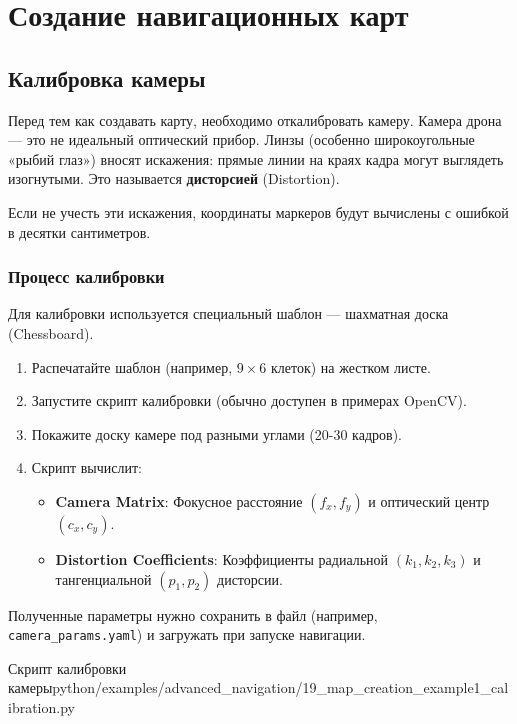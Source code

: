 \section{Создание навигационных карт}

\subsection{Калибровка камеры}
Перед тем как создавать карту, необходимо откалибровать камеру. Камера дрона — это не идеальный оптический прибор. Линзы (особенно широкоугольные «рыбий глаз») вносят искажения: прямые линии на краях кадра могут выглядеть изогнутыми. Это называется \textbf{дисторсией} (Distortion).

Если не учесть эти искажения, координаты маркеров будут вычислены с ошибкой в десятки сантиметров.

\subsubsection{Процесс калибровки}
Для калибровки используется специальный шаблон — шахматная доска (Chessboard).
\begin{enumerate}
    \item Распечатайте шаблон (например, $9 \times 6$ клеток) на жестком листе.
    \item Запустите скрипт калибровки (обычно доступен в примерах OpenCV).
    \item Покажите доску камере под разными углами (20-30 кадров).
    \item Скрипт вычислит:
    \begin{itemize}
        \item \textbf{Camera Matrix}: Фокусное расстояние $(f_x, f_y)$ и оптический центр $(c_x, c_y)$.
        \item \textbf{Distortion Coefficients}: Коэффициенты радиальной $(k_1, k_2, k_3)$ и тангенциальной $(p_1, p_2)$ дисторсии.
    \end{itemize}
\end{enumerate}

Полученные параметры нужно сохранить в файл (например, \texttt{camera\_params.yaml}) и загружать при запуске навигации.

\begin{codefiletitle}[python]{Скрипт калибровки камеры}{python/examples/advanced_navigation/19_map_creation_example1_calibration.py}
\end{codefiletitle}

